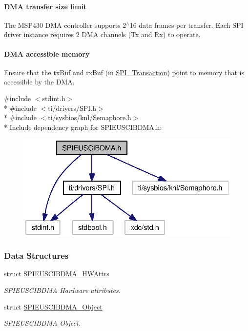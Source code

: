\paragraph*{D\-M\-A transfer size limit}

The M\-S\-P430 D\-M\-A controller supports 2$^\wedge$16 data frames per transfer. Each S\-P\-I driver instance requires 2 D\-M\-A channels (Tx and Rx) to operate.

\paragraph*{D\-M\-A accessible memory}

Ensure that the tx\-Buf and rx\-Buf (in \hyperlink{struct_s_p_i___transaction}{S\-P\-I\-\_\-\-Transaction}) point to memory that is accessible by the D\-M\-A. 

{\ttfamily \#include $<$stdint.\-h$>$}\\*
{\ttfamily \#include $<$ti/drivers/\-S\-P\-I.\-h$>$}\\*
{\ttfamily \#include $<$ti/sysbios/knl/\-Semaphore.\-h$>$}\\*
Include dependency graph for S\-P\-I\-E\-U\-S\-C\-I\-B\-D\-M\-A.\-h\-:
\nopagebreak
\begin{figure}[H]
\begin{center}
\leavevmode
\includegraphics[width=322pt]{_s_p_i_e_u_s_c_i_b_d_m_a_8h__incl}
\end{center}
\end{figure}
\subsubsection*{Data Structures}
\begin{DoxyCompactItemize}
\item 
struct \hyperlink{struct_s_p_i_e_u_s_c_i_b_d_m_a___h_w_attrs}{S\-P\-I\-E\-U\-S\-C\-I\-B\-D\-M\-A\-\_\-\-H\-W\-Attrs}
\begin{DoxyCompactList}\small\item\em S\-P\-I\-E\-U\-S\-C\-I\-B\-D\-M\-A Hardware attributes. \end{DoxyCompactList}\item 
struct \hyperlink{struct_s_p_i_e_u_s_c_i_b_d_m_a___object}{S\-P\-I\-E\-U\-S\-C\-I\-B\-D\-M\-A\-\_\-\-Object}
\begin{DoxyCompactList}\small\item\em S\-P\-I\-E\-U\-S\-C\-I\-B\-D\-M\-A Object. \end{DoxyCompactList}\end{DoxyCompactItemize}
